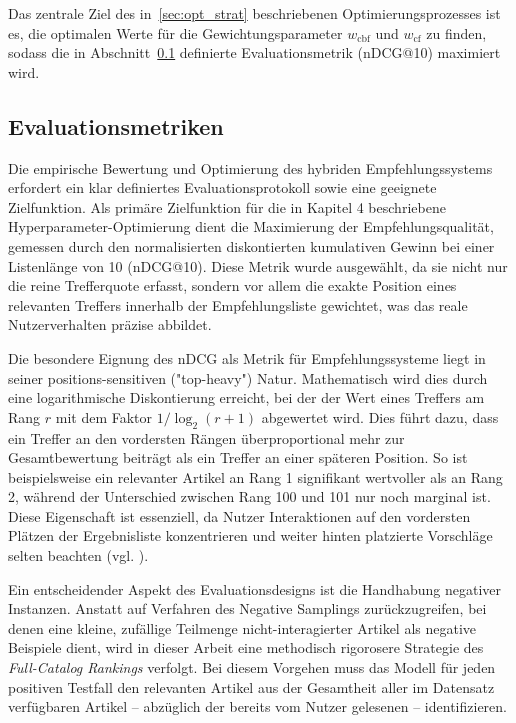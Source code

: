 Das zentrale Ziel des in~\ref{sec:opt_strat} beschriebenen Optimierungsprozesses 
ist es, die optimalen Werte für die Gewichtungsparameter $w_\mathrm{cbf}$ und $w_\mathrm{cf}$ zu finden, 
sodass die in Abschnitt~\ref{sec:metrics} definierte Evaluationsmetrik (nDCG@10) maximiert wird.

\subsection{Evaluationsmetriken}
\label{sec:metrics}
Die empirische Bewertung und Optimierung des hybriden Empfehlungssystems erfordert ein klar definiertes 
Evaluationsprotokoll sowie eine geeignete Zielfunktion. Als primäre Zielfunktion für die in Kapitel 4 
beschriebene Hyperparameter-Optimierung dient die Maximierung der Empfehlungsqualität, gemessen durch 
den normalisierten diskontierten kumulativen Gewinn bei einer Listenlänge von 10 (nDCG@10). Diese Metrik 
wurde ausgewählt, da sie nicht nur die reine Trefferquote erfasst, sondern vor allem die exakte Position 
eines relevanten Treffers innerhalb der Empfehlungsliste gewichtet, was das reale Nutzerverhalten präzise abbildet.

Die besondere Eignung des nDCG als Metrik für Empfehlungssysteme liegt in seiner positions-sensitiven 
("top-heavy") Natur. Mathematisch wird dies durch eine logarithmische Diskontierung erreicht, bei der der 
Wert eines Treffers am Rang $r$ mit dem Faktor $1/\log_2(r+1)$ abgewertet wird. Dies führt dazu, dass ein 
Treffer an den vordersten Rängen überproportional mehr zur Gesamtbewertung beiträgt als ein Treffer an einer 
späteren Position. So ist beispielsweise ein relevanter Artikel an Rang 1 signifikant wertvoller als 
an Rang 2, während der Unterschied zwischen Rang 100 und 101 nur noch marginal ist. Diese Eigenschaft ist 
essenziell, da Nutzer Interaktionen auf den vordersten Plätzen der Ergebnisliste konzentrieren und weiter 
hinten platzierte Vorschläge selten beachten (vgl. \cite{krichene_sampled_2020}).

Ein entscheidender Aspekt des Evaluationsdesigns ist die Handhabung negativer Instanzen. Anstatt auf 
Verfahren des Negative Samplings zurückzugreifen, bei denen eine kleine, zufällige Teilmenge 
nicht-interagierter Artikel als negative Beispiele dient, wird in dieser Arbeit eine 
methodisch rigorosere Strategie des \textit{Full-Catalog Rankings} verfolgt. Bei diesem Vorgehen muss 
das Modell für jeden positiven Testfall den relevanten Artikel aus der Gesamtheit aller im 
Datensatz verfügbaren Artikel – abzüglich der bereits vom Nutzer gelesenen – identifizieren.

